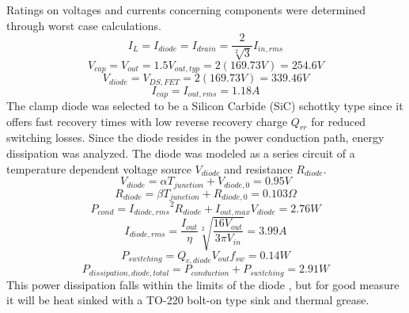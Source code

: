 Ratings on voltages and currents concerning components were determined through worst case calculations.\cite{kwasinski} 
\begin{equation}
I_L = I_{diode} = I_{drain} = \frac{2}{\sqrt[2]{3}}I_{in,rms} 
\end{equation}
\begin{equation}
 V_{cap} = V_{out} = 1.5V_{out,typ} = 2(169.73V) = 254.6V 
\end{equation}
\begin{equation}
 V_{diode} = V_{DS,FET} = 2(169.73V) =339.46V  
\end{equation}
\begin{equation}
I_{cap} = I_{out,rms} = 1.18A 
\end{equation}
The clamp diode was selected to be a Silicon Carbide (SiC) schottky type  since it offers fast recovery times with low reverse recovery charge $Q_{rr}$ for reduced switching losses. Since the diode resides in the power conduction path, energy dissipation was analyzed. The diode was modeled as a series circuit of a temperature dependent voltage source $ V_{diode}$ and resistance $R_{diode}$.\cite{CREE}
\begin{equation}
 V_{diode} = \alpha T_{junction}+V_{diode,0} =  0.95V 
\end{equation}
\begin{equation}
 R_{diode} = \beta T_{junction}+R_{diode,0} = 0.103\Omega
\end{equation}
\begin{equation}
 P_{cond} = {I_{diode,rms}}^2R_{diode}+I_{out,max}V_{diode} = 2.76W
\end{equation}
\begin{equation}
 I_{diode,rms} = \frac{I_{out}}{\eta} \sqrt[2]{ \frac{16V_{out}}{3 \pi V_{in}}}= 3.99A
\end{equation}
\begin{equation}
P_{switching} = Q_{c,diode}V_{out}f_{sw}=0.14W
\end{equation}
\begin{equation}
 P_{dissipation,diode,total}= P_{conduction}+P_{switching}=2.91W 
\end{equation}
This power dissipation falls within the limits of the diode , but for good measure it will be heat sinked with a TO-220 bolt-on type sink and thermal grease. 
